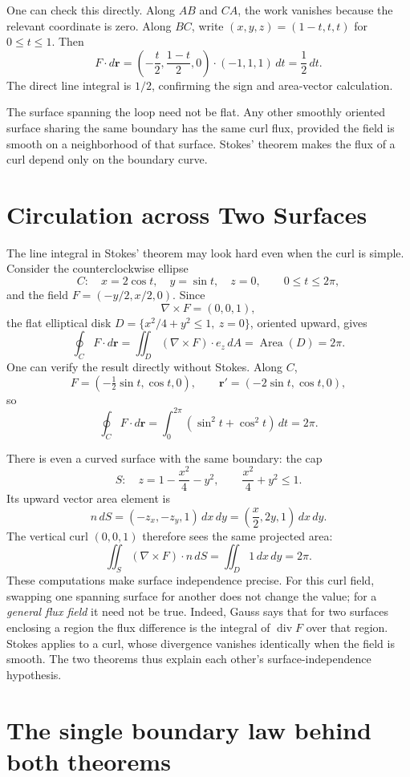One can check this directly. Along \(AB\) and \(CA\), the work vanishes because the relevant coordinate is zero. Along \(BC\), write \((x,y,z)=(1-t,t,t)\) for \(0\le t\le1\). Then
\[
 F\cdot d\mathbf r
 =\left(-\frac t2,\frac{1-t}{2},0\right)
      \cdot(-1,1,1)\,dt
 =\frac12\,dt.
\]
The direct line integral is \(1/2\), confirming the sign and area-vector calculation.

The surface spanning the loop need not be flat. Any other smoothly oriented surface sharing the same boundary has the same curl flux, provided the field is smooth on a neighborhood of that surface. Stokes' theorem makes the flux of a curl depend only on the boundary curve.

\section{Circulation across Two Surfaces}

The line integral in Stokes' theorem may look hard even when the curl is simple. Consider the counterclockwise ellipse
\[
 C:\quad x=2\cos t,\quad y=\sin t,\quad z=0,
 \qquad0\le t\le2\pi,
\]
and the field $F=(-y/2,x/2,0)$. Since
\[
 \nabla\times F=(0,0,1),
\]
the flat elliptical disk $D=\{x^2/4+y^2\le1,\ z=0\}$, oriented upward, gives
\[
 \oint_C F\cdot d\mathbf r
 =\iint_D (\nabla\times F)\cdot e_z\,dA
 =\operatorname{Area}(D)=2\pi.
\]
One can verify the result directly without Stokes. Along $C$,
\[
 F=(-\tfrac12\sin t,\cos t,0),
 \qquad
 \mathbf r'=(-2\sin t,\cos t,0),
\]
so
\[
 \boxed{\oint_C F\cdot d\mathbf r
 =\int_0^{2\pi}(\sin^2t+\cos^2t)\,dt=2\pi.}
\]

There is even a curved surface with the same boundary: the cap
\[
 S:\quad z=1-\frac{x^2}{4}-y^2,
 \qquad \frac{x^2}{4}+y^2\le1.
\]
Its upward vector area element is
\[
 n\,dS=(-z_x,-z_y,1)\,dx\,dy
 =\left(\frac x2,2y,1\right)\,dx\,dy.
\]
The vertical curl $(0,0,1)$ therefore sees the same projected area:
\[
 \iint_S(\nabla\times F)\cdot n\,dS
 =\iint_D1\,dx\,dy=2\pi.
\]
These computations make surface independence precise. For this curl field, swapping one spanning surface for another does not change the value; for a \emph{general flux field} it need not be true. Indeed, Gauss says that for two surfaces enclosing a region the flux difference is the integral of $\operatorname{div}F$ over that region. Stokes applies to a curl, whose divergence vanishes identically when the field is smooth. The two theorems thus explain each other's surface-independence hypothesis.

\section{The single boundary law behind both theorems}

